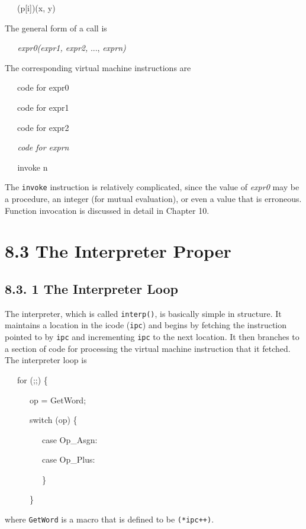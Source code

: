 {\ttfamily\mdseries
\ \ \ (p[i])(x, y)}

The general form of a call is

{\ttfamily\mdseries
\textit{\ \ \ expr0(expr1, expr2, }..., \textit{exprn)}}

The corresponding virtual machine instructions are

{\ttfamily\mdseries
\ \ \ code for expr0}

{\ttfamily\mdseries
\ \ \ code for expr1}

{\ttfamily\mdseries
\ \ \ code for expr2}

{\ttfamily\itshape
\ \ \ code for exprn}

{\ttfamily\mdseries
\textit{\ \ \ }invoke n}

The \texttt{invoke} instruction is relatively complicated, since the
value of \textit{expr0 }may be a procedure, an integer (for mutual
evaluation), or even a value that is erroneous. Function invocation is
discussed in detail in Chapter 10.

\section[8.3 The Interpreter Proper]{8.3 The Interpreter Proper}
\subsection[8.3. 1 The Interpreter Loop]{8.3. 1 The Interpreter Loop}

The interpreter, which is called \texttt{interp()}, is basically
simple in structure. It maintains a location in the icode
(\texttt{ipc}) and begins by fetching the instruction pointed to by
\texttt{ipc} and incrementing \texttt{ipc} to the next location. It
then branches to a section of code for processing the virtual machine
instruction that it fetched. The interpreter loop is

{\ttfamily\mdseries
\ \ \ for (;;) \{}

{\ttfamily\mdseries
\ \ \ \ \ \ op = GetWord;}

{\ttfamily\mdseries
\ \ \ \ \ \ switch (op) \{}

{\ttfamily\mdseries
\ \ \ \ \ \ \ \ \ case Op\_Asgn:}

{\ttfamily\mdseries
\ \ \ \ \ \ \ \ \ case Op\_Plus:}

{\ttfamily\mdseries
\ \ \ \ \ \ \ \ \ \}}

{\ttfamily\mdseries
\ \ \ \ \ \ \}}

\noindent
where \texttt{GetWord} is a macro that is defined to be \texttt{(*ipc++)}.

